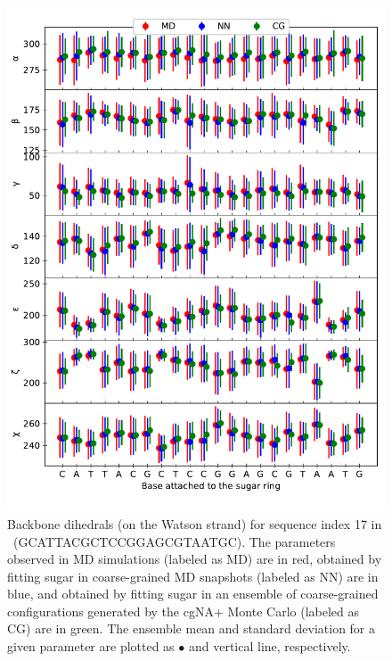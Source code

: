 \begin{figure}[H]
	\begin{center}
	\includegraphics[width=15cm]{images/dihed_stats_17_1.pdf}
	\caption{Backbone dihedrals (on the Watson strand) for sequence index 17 in \Lbdna \ (GCATTACGCTCCGGAGCGTAATGC).  
    The parameters observed in MD simulations (labeled as MD) are in red, obtained by fitting sugar in coarse-grained MD snapshots (labeled as NN) are in blue, and obtained by fitting sugar in an ensemble of coarse-grained configurations generated by the cgNA$+$ Monte Carlo (labeled as CG) are in green. 
    The ensemble mean and standard deviation for a given parameter are plotted as $\bullet$ and vertical line, respectively.
	}
\label{c7:fig6}
\end{center}
\end{figure}

